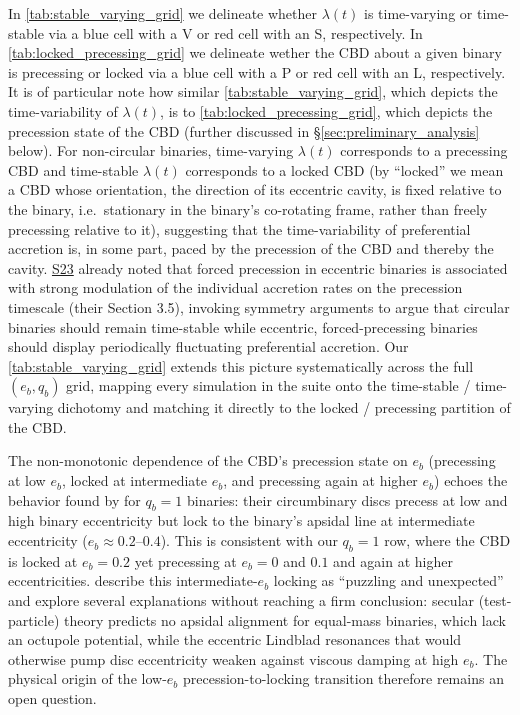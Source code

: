 \documentclass[fleqn,usenatbib]{mnras}
\newcommand{\Stwentythree}{\href{https://doi.org/10.1093/mnras/stac3263}{S23}\xspace}
\begin{document}
In \autoref{tab:stable_varying_grid} we delineate whether $\lambda(t)$ is time-varying or time-stable via a blue cell with a V or red cell with an S, respectively. In \autoref{tab:locked_precessing_grid} we delineate wether the CBD about a given binary is precessing or locked via a blue cell with a P or red cell with an L, respectively. It is of particular note how similar \autoref{tab:stable_varying_grid}, which depicts the time-variability of $\lambda(t)$, is to \autoref{tab:locked_precessing_grid}, which depicts the precession state of the CBD (further discussed in \S\ref{sec:preliminary_analysis} below). For non-circular binaries, time-varying $\lambda(t)$ corresponds to a precessing CBD and time-stable $\lambda(t)$ corresponds to a locked CBD (by ``locked'' we mean a CBD whose orientation, the direction of its eccentric cavity, is fixed relative to the binary, i.e.\ stationary in the binary's co-rotating frame, rather than freely precessing relative to it), suggesting that the time-variability of preferential accretion is, in some part, paced by the precession of the CBD and thereby the cavity. \Stwentythree already noted that forced precession in eccentric binaries is associated with strong modulation of the individual accretion rates on the precession timescale (their Section 3.5), invoking symmetry arguments to argue that circular binaries should remain time-stable while eccentric, forced-precessing binaries should display periodically fluctuating preferential accretion. Our \autoref{tab:stable_varying_grid} extends this picture systematically across the full $(e_b, q_b)$ grid, mapping every simulation in the suite onto the time-stable / time-varying dichotomy and matching it directly to the locked / precessing partition of the CBD.

The non-monotonic dependence of the CBD's precession state on $e_b$ (precessing at low $e_b$, locked at intermediate $e_b$, and precessing again at higher $e_b$) echoes the behavior found by \citet{miranda_munoz_lai_2017} for $q_b = 1$ binaries: their circumbinary discs precess at low and high binary eccentricity but lock to the binary's apsidal line at intermediate eccentricity ($e_b \approx 0.2$--$0.4$). This is consistent with our $q_b = 1$ row, where the CBD is locked at $e_b = 0.2$ yet precessing at $e_b = 0$ and $0.1$ and again at higher eccentricities. \citet{miranda_munoz_lai_2017} describe this intermediate-$e_b$ locking as ``puzzling and unexpected'' and explore several explanations without reaching a firm conclusion: secular (test-particle) theory predicts no apsidal alignment for equal-mass binaries, which lack an octupole potential, while the eccentric Lindblad resonances that would otherwise pump disc eccentricity weaken against viscous damping at high $e_b$. The physical origin of the low-$e_b$ precession-to-locking transition therefore remains an open question.
\end{document}

